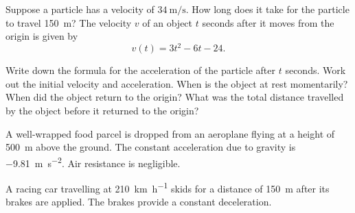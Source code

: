 \begin{questions}
  \questioA Suppose a particle has a velocity of $ \SI{34}{\metre\per\second} $. How long does it take for the particle to travel \SI{150}{\metre}?
  \question The velocity $ v $ of an object $ t $ seconds after it moves from the origin is given by
            \begin{displaymath}
              v(t) = 3t^2 - 6t - 24.
            \end{displaymath}
    \begin{parts}
      \parA Write down the formula for the acceleration of the particle after $ t $ seconds.
      \parA Work out the initial velocity and acceleration.
      \parA When is the object at rest momentarily?
      \parM When did the object return to the origin?
      \parE What was the total distance travelled by the object before it returned to the origin?
    \end{parts}
  \questioA A well-wrapped food parcel is dropped from an aeroplane flying at a height of \SI{500}{\metre}
            above the ground. The constant acceleration due to gravity is \SI{-9.81}{\metre\per\second\squared}. Air resistance
            is negligible.
  \questioA A racing car travelling at \SI{210}{\kilo\metre\per\hour} skids for a distance of \SI{150}{\metre}
            after its brakes are applied. The brakes provide a constant deceleration.
\end{questions}
